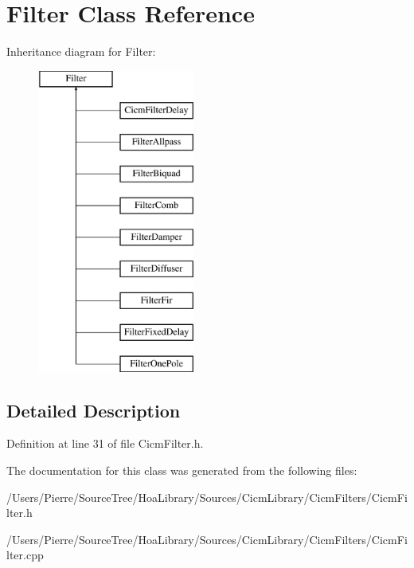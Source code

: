 \hypertarget{class_filter}{\section{Filter Class Reference}
\label{class_filter}
}
Inheritance diagram for Filter\-:\begin{figure}[H]
\begin{center}
\leavevmode
\includegraphics[height=10.000000cm]{class_filter}
\end{center}
\end{figure}


\subsection{Detailed Description}


Definition at line 31 of file Cicm\-Filter.\-h.



The documentation for this class was generated from the following files\-:\begin{DoxyCompactItemize}
\item 
/\-Users/\-Pierre/\-Source\-Tree/\-Hoa\-Library/\-Sources/\-Cicm\-Library/\-Cicm\-Filters/Cicm\-Filter.\-h\item 
/\-Users/\-Pierre/\-Source\-Tree/\-Hoa\-Library/\-Sources/\-Cicm\-Library/\-Cicm\-Filters/Cicm\-Filter.\-cpp\end{DoxyCompactItemize}
